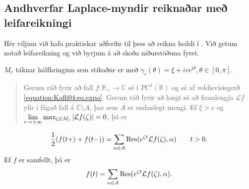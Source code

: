 \documentclass[a4paper,10pt,icelandic]{sphinxmanual}
\begin{document}
\subsection{Andhverfar Laplace-myndir reiknaðar með leifareikningi}
\label{\detokenize{Kafli04:andhverfar-laplace-myndir-reiknaar-me-leifareikningi}}\label{\detokenize{Kafli04:laplaceres}}
Hér viljum við hafa praktiskar aðferðir til þess að reikna heildi í {\hyperref[\detokenize{Kafli04:fouriermellin}]{}}.
Við getum notað leifareikning og við byrjum á að skoða niðurstöðuna fyrst.

\(M_r\) táknar hálfhringinn sem stikaður er með \(\gamma_r(\theta)=\xi+i r e^{i\theta}, \theta\in [0, \pi]\).

\begin{quote}

Gerum ráð fyrir að fall \(f:{{\mathbb R}}_+\to {{\mathbb C}}\) sé í \(PC^1 (\mathbb R)\) og sé af veldisvísisgerð \eqref{equation:Kafli04:eq.expo}.
Gerum ráð fyrir að hægt sé að framlengja \(\mathcal{L}f\) yfir í fágað fall á \(\mathbb C\setminus A\), þar sem \(A\) er endanlegt mengi.
Ef \(\xi>c\) og \(\lim\limits_{r\to +\infty}\max_{\zeta\in M_r}|{{\cal L}}f(\zeta)|=0\),
þá er
\end{quote}
\begin{equation}\label{equation:Kafli04:eq.LaplaceRes}
\begin{split}\frac 12(f(t+)+f(t-))=
\sum_{\alpha\in A}{{\operatorname{Res}}}(e^{\zeta t}{{\cal L}}f(\zeta),\alpha)
\qquad t>0.\end{split}
\end{equation}
Ef \(f\) er samfellt, þá er
\begin{equation*}
\begin{split}f(t)= \sum_{\alpha\in A}{{\operatorname{Res}}}(e^{\zeta t}{{\cal L}}f(\zeta),\alpha).\end{split}
\end{equation*}
\end{document}

